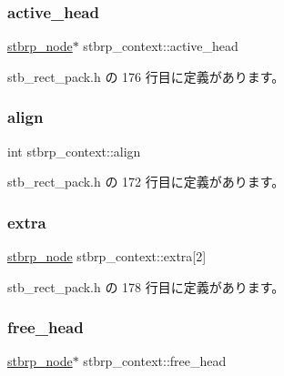\subsubsection{\texorpdfstring{active\+\_\+head}{active\_head}}
{\footnotesize\ttfamily \mbox{\hyperlink{structstbrp__node}{stbrp\+\_\+node}}$\ast$ stbrp\+\_\+context\+::active\+\_\+head}



 stb\+\_\+rect\+\_\+pack.\+h の 176 行目に定義があります。

\mbox{\label{structstbrp__context_ae36053e2001a725aec2b5756dc990481}} 
\subsubsection{\texorpdfstring{align}{align}}
{\footnotesize\ttfamily int stbrp\+\_\+context\+::align}



 stb\+\_\+rect\+\_\+pack.\+h の 172 行目に定義があります。

\mbox{\label{structstbrp__context_a0b80e1fbdac125427526f3500d4e7624}} 
\subsubsection{\texorpdfstring{extra}{extra}}
{\footnotesize\ttfamily \mbox{\hyperlink{structstbrp__node}{stbrp\+\_\+node}} stbrp\+\_\+context\+::extra\mbox{[}2\mbox{]}}



 stb\+\_\+rect\+\_\+pack.\+h の 178 行目に定義があります。

\mbox{\label{structstbrp__context_a1336ae32373663847866cc65904c2839}} 
\subsubsection{\texorpdfstring{free\+\_\+head}{free\_head}}
{\footnotesize\ttfamily \mbox{\hyperlink{structstbrp__node}{stbrp\+\_\+node}}$\ast$ stbrp\+\_\+context\+::free\+\_\+head}



